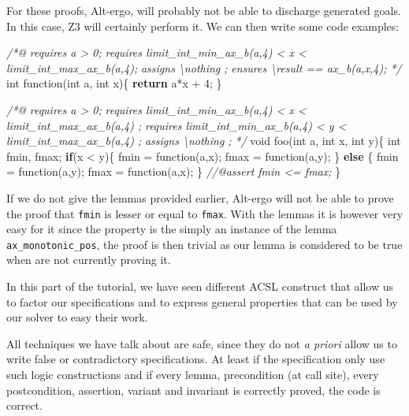 \documentclass[12pt,francais,]{scrbook}
\newenvironment{Shaded}{}{}
\newcommand{\KeywordTok}[1]{\textcolor[rgb]{0.00,0.44,0.13}{\textbf{{#1}}}}
\newcommand{\DataTypeTok}[1]{\textcolor[rgb]{0.56,0.13,0.00}{{#1}}}
\newcommand{\DecValTok}[1]{\textcolor[rgb]{0.25,0.63,0.44}{{#1}}}
\newcommand{\CommentTok}[1]{\textcolor[rgb]{0.38,0.63,0.69}{\textit{{#1}}}}
\newcommand{\NormalTok}[1]{{#1}}
\begin{document}
For these proofs, Alt-ergo, will probably not be able to discharge
generated goals. In this case, Z3 will certainly perform it. We can then
write some code examples:

\begin{footnotesize}\begin{Shaded}
\begin{Highlighting}[]
\CommentTok{/*@}
\CommentTok{  requires a > 0;}
\CommentTok{  requires limit_int_min_ax_b(a,4) < x < limit_int_max_ax_b(a,4);}
\CommentTok{  assigns \textbackslash{}nothing ;}
\CommentTok{  ensures \textbackslash{}result == ax_b(a,x,4);}
\CommentTok{*/}
\DataTypeTok{int} \NormalTok{function(}\DataTypeTok{int} \NormalTok{a, }\DataTypeTok{int} \NormalTok{x)\{}
  \KeywordTok{return} \NormalTok{a*x + }\DecValTok{4}\NormalTok{;}
\NormalTok{\}}

\CommentTok{/*@ }
\CommentTok{  requires a > 0;}
\CommentTok{  requires limit_int_min_ax_b(a,4) < x < limit_int_max_ax_b(a,4) ;}
\CommentTok{  requires limit_int_min_ax_b(a,4) < y < limit_int_max_ax_b(a,4) ;}
\CommentTok{  assigns \textbackslash{}nothing ;}
\CommentTok{*/}
\DataTypeTok{void} \NormalTok{foo(}\DataTypeTok{int} \NormalTok{a, }\DataTypeTok{int} \NormalTok{x, }\DataTypeTok{int} \NormalTok{y)\{}
  \DataTypeTok{int} \NormalTok{fmin, fmax;}
  \KeywordTok{if}\NormalTok{(x < y)\{}
    \NormalTok{fmin = function(a,x);}
    \NormalTok{fmax = function(a,y);}
  \NormalTok{\} }\KeywordTok{else} \NormalTok{\{}
    \NormalTok{fmin = function(a,y);}
    \NormalTok{fmax = function(a,x);}
  \NormalTok{\}}
  \CommentTok{//@assert fmin <= fmax;}
\NormalTok{\}}
\end{Highlighting}
\end{Shaded}\end{footnotesize}

If we do not give the lemmas provided earlier, Alt-ergo will not be able
to prove the proof that \texttt{fmin} is lesser or equal to
\texttt{fmax}. With the lemmas it is however very easy for it since the
property is the simply an instance of the lemma
\texttt{ax\_monotonic\_pos}, the proof is then trivial as our lemma is
considered to be true when are not currently proving it.

In this part of the tutorial, we have seen different ACSL construct that
allow us to factor our specifications and to express general properties
that can be used by our solver to easy their work.

All techniques we have talk about are safe, since they do not \emph{a
priori} allow us to write false or contradictory specifications. At
least if the specification only use such logic constructions and if
every lemma, precondition (at call site), every postcondition,
assertion, variant and invariant is correctly proved, the code is
correct.
\end{document}
